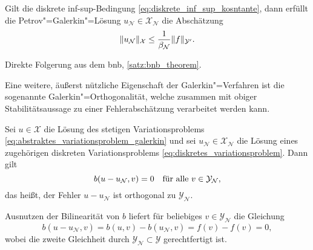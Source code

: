 \documentclass[../main.tex]{subfiles}
\begin{document}
\begin{Satz}
    \label{satz:galerkin_stabilitaet}
    Gilt die diskrete inf-sup-Bedingung \cref{eq:diskrete_inf_sup_kosntante}, dann erfüllt die Petrov"=Galerkin"=Lösung $u_{\mathcal N} \in \mathcal X_{\mathcal N}$ die Abschätzung
    \begin{equation}
        \label{eq:galerkin_statibilitaet}
        \norm{u_{\mathcal N}}_{\mathcal X} \leq \frac{1}{\beta_{\mathcal N}} \norm{f}_{\mathcal Y'}.
    \end{equation}

    \begin{Beweis}
        Direkte Folgerung aus dem \acl{bnb}, \cref{satz:bnb_theorem}.
    \end{Beweis}
\end{Satz}

Eine weitere, äußerst nützliche Eigenschaft der Galerkin"=Verfahren ist die sogenannte Galerkin"=Orthogonalität, welche zusammen mit obiger Stabilitätsaussage zu einer Fehlerabschätzung verarbeitet werden kann.

\begin{Lemma}
    \label{lemma:galerkin_orthogonalitaet}
    Sei $u \in \mathcal X$ die Lösung des stetigen Variationsproblems \cref{eq:abstraktes_variationsproblem_galerkin} und sei $u_{\mathcal N} \in \mathcal X_{\mathcal N}$ die Lösung eines zugehörigen diskreten Variationsproblems \cref{eq:diskretes_variationsproblem}.
    Dann gilt
    \begin{equation}
        \label{eq:galerkin_orthogonalitaet}
        b(u - u_{\mathcal N}, v) = 0 \quad \fa v \in \mathcal Y_{\mathcal N},
    \end{equation}
    das heißt, der Fehler $u - u_{\mathcal N}$ ist orthogonal zu $\mathcal Y_{\mathcal N}$.

    \begin{Beweis}
        Ausnutzen der Bilinearität von $b$ liefert für beliebiges $v \in \mathcal Y_{\mathcal N}$ die Gleichung
        \begin{equation}
            b(u - u_{\mathcal N}, v) = b(u, v) - b(u_{\mathcal N}, v) = f(v) - f(v) = 0,
        \end{equation}
        wobei die zweite Gleichheit durch $\mathcal Y_{\mathcal N} \subset \mathcal Y$ gerechtfertigt ist.
    \end{Beweis}
\end{Lemma}
\end{document}
